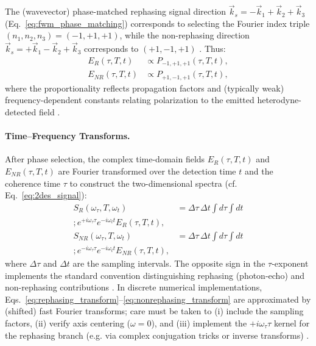 \noindent The (wavevector) phase-matched rephasing signal direction $\vec{k}_s = -\vec{k}_1 + \vec{k}_2 + \vec{k}_3$ (Eq.~\eqref{eq:fwm_phase_matching}) corresponds to selecting the Fourier index triple $(n_1,n_2,n_3)=(-1,+1,+1)$, while the non-rephasing direction $\vec{k}_s = +\vec{k}_1 - \vec{k}_2 + \vec{k}_3$ corresponds to $(+1,-1,+1)$ \cite{Mukamel1995PrinciplesNonlinearOptical, Cho2009TwodimensionalOpticalSpectroscopy, GreenEtAl2024}. Thus:
\begin{align}
    E_{R}(\tau, T, t)  & \propto P_{-1,+1,+1}(\tau, T, t),
    \label{eq:rephasing_selection} \\
    E_{NR}(\tau, T, t) & \propto P_{+1,-1,+1}(\tau, T, t),
    \label{eq:nonrephasing_selection}
\end{align}
where the proportionality reflects propagation factors and (typically weak) frequency-dependent constants relating polarization to the emitted heterodyne-detected field \cite{Mukamel1995PrinciplesNonlinearOptical, GreenEtAl2024}.

\paragraph{Time--Frequency Transforms.}
\noindent After phase selection, the complex time-domain fields $E_{R}(\tau, T, t)$ and $E_{NR}(\tau, T, t)$ are Fourier transformed over the detection time $t$ and the coherence time $\tau$ to construct the two-dimensional spectra (cf. Eq.~\eqref{eq:2des_signal}):
\begin{align}
    S_{R}(\omega_\tau, T, \omega_t)
        & =
        \Delta\tau\, \Delta t
        \int d\tau \int dt \\;
        e^{+ i \omega_\tau \tau} e^{- i \omega_t t}
        E_{R}(\tau, T, t),
        \label{eq:rephasing_transform} \\
    S_{NR}(\omega_\tau, T, \omega_t)
        & =
        \Delta\tau\, \Delta t
        \int d\tau \int dt \\;
        e^{- i \omega_\tau \tau} e^{- i \omega_t t}
        E_{NR}(\tau, T, t),
        \label{eq:nonrephasing_transform}
\end{align}
where $\Delta\tau$ and $\Delta t$ are the sampling intervals. The opposite sign in the $\tau$-exponent implements the standard convention distinguishing rephasing (photon-echo) and non-rephasing contributions \cite{Cho2009TwodimensionalOpticalSpectroscopy, GreenEtAl2024}. In discrete numerical implementations, Eqs.~\eqref{eq:rephasing_transform}--\eqref{eq:nonrephasing_transform} are approximated by (shifted) fast Fourier transforms; care must be taken to (i) include the sampling factors, (ii) verify axis centering ($\omega=0$), and (iii) implement the $+i\omega_\tau\tau$ kernel for the rephasing branch (e.g. via complex conjugation tricks or inverse transforms) \cite{Cho2009TwodimensionalOpticalSpectroscopy, GreenEtAl2024}.

